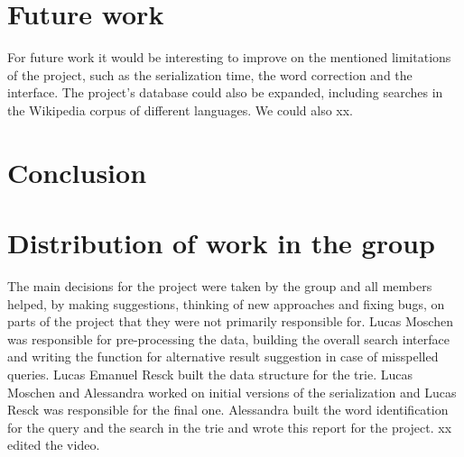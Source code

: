 \documentclass{article}
\begin{document}

\section*{Future work}
For future work it would be interesting to improve on the mentioned limitations of the project, such as the serialization time, the word correction and the interface. The project's database could also be expanded, including searches in the Wikipedia corpus of different languages. We could also xx. 

\section*{Conclusion}

\section*{Distribution of work in the group}
The main decisions for the project were taken by the group and all members helped, by making suggestions, thinking of new approaches and fixing bugs, on parts of the project that they were not primarily responsible for. Lucas Moschen was responsible for pre-processing the data, building the overall search interface and writing the function for alternative result suggestion in case of misspelled queries. Lucas Emanuel Resck built the data structure for the trie. Lucas Moschen and Alessandra worked on initial versions of the serialization and Lucas Resck was responsible for the final one. Alessandra built the word identification for the query and the search in the trie and wrote this report for the project. xx edited the video.

\end{document}
